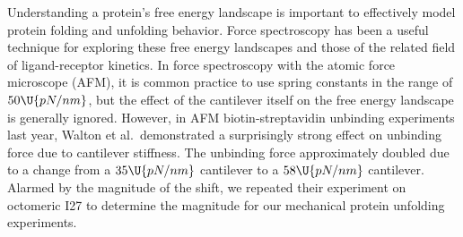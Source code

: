 Understanding a protein's free energy landscape is important to
effectively model protein folding and unfolding behavior.  Force
spectroscopy has been a useful technique for exploring these free
energy landscapes and those of the related field of ligand-receptor
kinetics.  In force spectroscopy with the atomic force microscope
(AFM), it is common practice to use spring constants in the range of
$50\U{pN/nm}$, but the effect of the cantilever itself on the free
energy landscape is generally ignored.  However, in AFM
biotin-streptavidin unbinding experiments last year, Walton et al.\
demonstrated a surprisingly strong effect on unbinding force due to
cantilever stiffness\citep{walton08}.  The unbinding force
approximately doubled due to a change from a $35\U{pN/nm}$ cantilever
to a $58\U{pN/nm}$ cantilever.  Alarmed by the magnitude of the shift,
we repeated their experiment on octomeric I27 to determine the
magnitude for our mechanical protein unfolding experiments.
